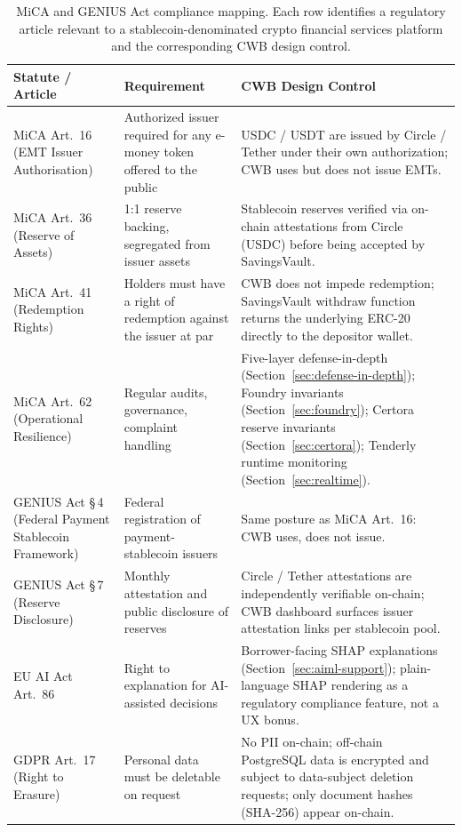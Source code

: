 \documentclass[12pt,a4paper]{report}
\begin{document}
\begin{table}[H]
\centering
\caption{MiCA and GENIUS Act compliance mapping. Each row identifies a regulatory article relevant to a stablecoin-denominated crypto financial services platform and the corresponding CWB design control.}
\label{tab:mica-mapping}
\small
\begin{tabular}{p{3.2cm}p{4.6cm}p{5.8cm}}
\hline
\textbf{Statute / Article} & \textbf{Requirement} & \textbf{CWB Design Control} \\
\hline
MiCA Art.~16 (EMT Issuer Authorisation) & Authorized issuer required for any e-money token offered to the public & USDC / USDT are issued by Circle / Tether under their own authorization; CWB uses but does not issue EMTs. \\
\hline
MiCA Art.~36 (Reserve of Assets) & 1{:}1 reserve backing, segregated from issuer assets & Stablecoin reserves verified via on-chain attestations from Circle (USDC) before being accepted by SavingsVault. \\
\hline
MiCA Art.~41 (Redemption Rights) & Holders must have a right of redemption against the issuer at par & CWB does not impede redemption; SavingsVault withdraw function returns the underlying ERC-20 directly to the depositor wallet. \\
\hline
MiCA Art.~62 (Operational Resilience) & Regular audits, governance, complaint handling & Five-layer defense-in-depth (Section~\ref{sec:defense-in-depth}); Foundry invariants (Section~\ref{sec:foundry}); Certora reserve invariants (Section~\ref{sec:certora}); Tenderly runtime monitoring (Section~\ref{sec:realtime}). \\
\hline
GENIUS Act \S\,4 (Federal Payment Stablecoin Framework) & Federal registration of payment-stablecoin issuers & Same posture as MiCA Art.~16: CWB uses, does not issue. \\
\hline
GENIUS Act \S\,7 (Reserve Disclosure) & Monthly attestation and public disclosure of reserves & Circle / Tether attestations are independently verifiable on-chain; CWB dashboard surfaces issuer attestation links per stablecoin pool. \\
\hline
EU AI Act Art.~86 & Right to explanation for AI-assisted decisions & Borrower-facing SHAP explanations (Section~\ref{sec:aiml-support}); plain-language SHAP rendering as a regulatory compliance feature, not a UX bonus. \\
\hline
GDPR Art.~17 (Right to Erasure) & Personal data must be deletable on request & No PII on-chain; off-chain PostgreSQL data is encrypted and subject to data-subject deletion requests; only document hashes (SHA-256) appear on-chain. \\
\hline
\end{tabular}
\end{table}
\end{document}
